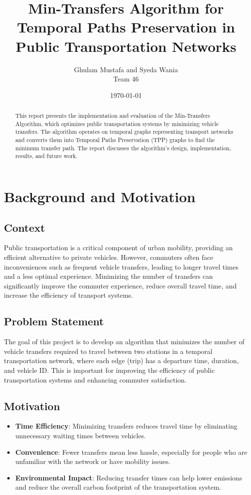 \documentclass[a4paper,12pt]{article}
\title{Min-Transfers Algorithm for Temporal Paths Preservation in Public Transportation Networks}
\author{Ghulam Mustafa and Syeda Wania \\ Team 46}
\date{\today}
\begin{document}
\maketitle

\begin{abstract}
This report presents the implementation and evaluation of the Min-Transfers Algorithm, which optimizes public transportation systems by minimizing vehicle transfers. The algorithm operates on temporal graphs representing transport networks and converts them into Temporal Paths Preservation (TPP) graphs to find the minimum transfer path. The report discusses the algorithm's design, implementation, results, and future work.
\end{abstract}

\section{Background and Motivation}

\subsection{Context}
Public transportation is a critical component of urban mobility, providing an efficient alternative to private vehicles. However, commuters often face inconveniences such as frequent vehicle transfers, leading to longer travel times and a less optimal experience. Minimizing the number of transfers can significantly improve the commuter experience, reduce overall travel time, and increase the efficiency of transport systems.

\subsection{Problem Statement}
The goal of this project is to develop an algorithm that minimizes the number of vehicle transfers required to travel between two stations in a temporal transportation network, where each edge (trip) has a departure time, duration, and vehicle ID. This is important for improving the efficiency of public transportation systems and enhancing commuter satisfaction.

\subsection{Motivation}
\begin{itemize}
    \item \textbf{Time Efficiency}: Minimizing transfers reduces travel time by eliminating unnecessary waiting times between vehicles.
    \item \textbf{Convenience}: Fewer transfers mean less hassle, especially for people who are unfamiliar with the network or have mobility issues.
    \item \textbf{Environmental Impact}: Reducing transfer times can help lower emissions and reduce the overall carbon footprint of the transportation system.
\end{itemize}
\end{document}
